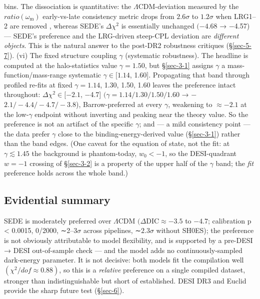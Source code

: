 \documentclass[preprint,12pt]{elsarticle}
\begin{document}
bins. The dissociation is quantitative: the
\(\Lambda \mathrm{CDM}\)-deviation measured by the
\(ratio(\omega _{\mathrm{m}})\) early-vs-late consistency metric drops
from \(2.6\sigma\) to \(1.2\sigma\) when LRG1--2 are removed
\citep{Liu:2024gfy}, whereas SEDE's \(\Delta \chi ^{2}\) is essentially
unchanged \((-4.68\) → −4.57) --- SEDE's preference and the LRG-driven
steep-CPL deviation are \emph{different objects}. This is the natural
answer to the post-DR2 robustness critiques (§\ref{sec-5-7}). (vi) The
fixed structure coupling \(\gamma\) (systematic robustness). The
headline is computed at the halo-statistics value \(\gamma  = 1.50\),
but §\ref{sec-3-1} assigns \(\gamma\) a mass-function/mass-range
systematic \(\gamma  \in  [1.14\), 1.60{]}. Propagating that band
through profiled re-fits at fixed \(\gamma  = 1.14\), 1.30, 1.50, 1.60
leaves the preference intact throughout:
\(\Delta \chi ^{2} \in  [-2.1\), −4.7{]}
\((\gamma  = 1.14/1.30/1.50/1.60\) → −\(2.1/-4.4/-4.7/-3.8\)),
Barrow-preferred at every \(\gamma\), weakening to \(\approx  -2.1\) at
the low-\(\gamma\) endpoint without inverting and peaking near the
theory value. So the preference is not an artifact of the specific
\(\gamma\); and --- a mild consistency point --- the data prefer
\(\gamma\) close to the binding-energy-derived value (§\ref{sec-3-1})
rather than the band edges. (One caveat for the equation of state, not
the fit: at \(\gamma  \lesssim  1.45\) the background is phantom-today,
\(w_{0} < -1\), so the DESI-quadrant \(w = -1\) crossing of
§\ref{sec-3-2} is a property of the upper half of the \(\gamma\) band;
the \emph{fit} preference holds across the whole band.)

\subsection{Evidential summary}\label{sec-5-5}

SEDE is moderately preferred over \(\Lambda \mathrm{CDM}\)
\((\Delta \mathrm{DIC} \approx  -3.5\) to \(-4.7\); calibration p
\textless{} 0.0015, 0/2000, ∼2--\(3\sigma\) across pipelines,
∼\(2.3\sigma\) without SH0ES); the preference is not obviously
attributable to model flexibility, and is supported by a pre-DESI → DESI
out-of-sample check --- and the model adds no continuously-sampled
dark-energy parameter. It is not decisive: both models fit the
compilation well \((\chi ^{2}/dof \approx  0.88)\), so this is a
\emph{relative} preference on a single compiled dataset, stronger than
indistinguishable but short of established. DESI DR3 and Euclid provide
the sharp future test (§\ref{sec-6}).
\end{document}
